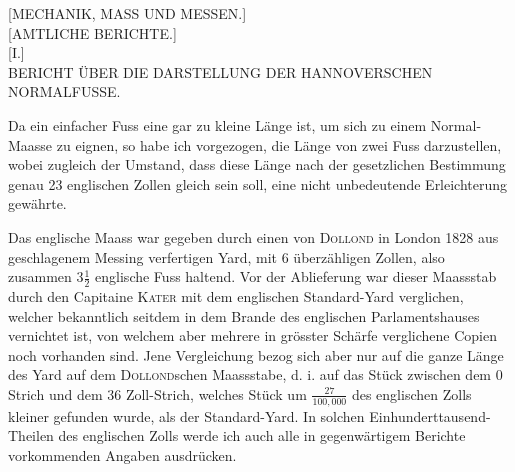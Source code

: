 \clearpage\begingroup\NoSourceHead{}
\begin{center}
{\Large [MECHANIK, MASS UND MESSEN.]}\\[1.3em]
{\large [AMTLICHE BERICHTE.]}\\[1.3em]
[I.]\\[.7em]
BERICHT ÜBER DIE DARSTELLUNG DER HANNOVERSCHEN\\
NORMALFUSSE.
\end{center}
\noindent\hspace*{\parindent}Da ein einfacher Fuss eine gar zu kleine Länge ist, um sich zu einem
Normal-Maasse zu eignen, so habe ich vorgezogen, die Länge von zwei Fuss
darzustellen, wobei zugleich der Umstand, dass diese Länge nach der gesetzlichen
Bestimmung genau 23 englischen Zollen gleich sein soll, eine nicht
unbedeutende Erleichterung gewährte.

Das englische Maass war gegeben durch einen von \textsc{Dollond} in London
1828 aus geschlagenem Messing verfertigen Yard, mit 6 überzähligen Zollen,
also zusammen \(3\frac{1}{2}\) englische Fuss haltend. Vor der Ablieferung war dieser
Maassstab durch den Capitaine \textsc{Kater} mit dem englischen Standard-Yard
verglichen, welcher bekanntlich seitdem in dem Brande des englischen Parlamentshauses
vernichtet ist, von welchem aber mehrere in grösster Schärfe
verglichene Copien noch vorhanden sind. Jene Vergleichung bezog sich aber
nur auf die ganze Länge des Yard auf dem \textsc{Dollond}schen Maassstabe, d. i. auf
das Stück zwischen dem 0 Strich und dem 36 Zoll-Strich, welches Stück
um \(\frac{27}{100{,}000}\) des englischen Zolls kleiner gefunden wurde, als der Standard-Yard.
In solchen Einhunderttausend-Theilen des englischen Zolls werde ich
auch alle in gegenwärtigem Berichte vorkommenden Angaben ausdrücken.
\HistoricalFoot{}{1\textsuperscript{*}}

